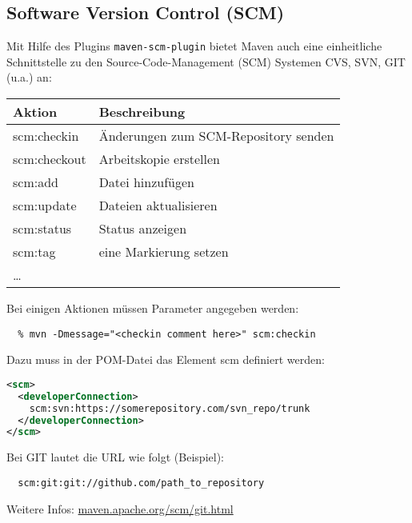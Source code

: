 \subsection{Software Version Control (SCM)}
Mit Hilfe des Plugins \verb+maven-scm-plugin+
bietet Maven auch eine einheitliche Schnittstelle zu
den Source-Code-Management (SCM) Systemen CVS, SVN, GIT (u.a.) an:
\begin{center}
\begin{tabular}{l|l}
Aktion & Beschreibung\\
\hline
 scm:checkin & Änderungen zum SCM-Repository senden\\
 scm:checkout & Arbeitskopie erstellen\\
 scm:add     & Datei hinzufügen\\
 scm:update  & Dateien aktualisieren \\
 scm:status & Status anzeigen\\
 scm:tag    & eine Markierung setzen\\
 \ldots
\end{tabular}
\end{center}
Bei einigen Aktionen müssen Parameter angegeben werden:
\begin{lstlisting}
  % mvn -Dmessage="<checkin comment here>" scm:checkin
\end{lstlisting}
Dazu muss in der POM-Datei das Element scm definiert werden:
\begin{lstlisting}[language=xml,
  morekeywords={scm,connection,developerConnection,url}]
<scm>
  <developerConnection>
    scm:svn:https://somerepository.com/svn_repo/trunk
  </developerConnection>
</scm>
\end{lstlisting}
Bei GIT lautet die URL wie folgt (Beispiel):
\begin{lstlisting}
  scm:git:git://github.com/path_to_repository
\end{lstlisting}
Weitere Infos: \href{http://maven.apache.org/scm/git.html}
                    {maven.apache.org/scm/git.html}
\newslide
